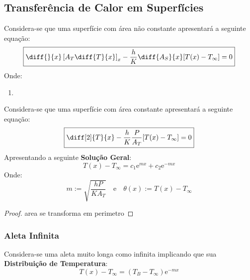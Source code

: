 \documentclass{article}
\begin{document}
        \subsection{Transferência de Calor em Superfícies}
            \begin{definition}
                Considera-se que uma superfície com área não constante apresentará a seguinte equação:
                    \begin{equation}
                        \boxed{
                            \diff{}{x} \left[A_{T}\diff{T}{x}\right]_{\substack{x}} -
                            \frac{h}{K}\diff{A_{S}}{x}[T(x) - T_{\infty}] = 0
                        }
                    \end{equation}
                Onde:
                    \begin{enumerate}
                        \item 
                    \end{enumerate}
            \end{definition}
            \begin{definition}
                Considera-se que uma superfície com área constante apresentará a seguinte equação:
                    \begin{equation}
                        \boxed{
                            \diff[2]{T}{x} -
                            \frac{h}{K}\frac{P}{A_{T}}[T(x) - T_{\infty}] = 0
                        }
                    \end{equation}
                Apresentando a seguinte \textbf{Solução Geral}:
                    \begin{equation}
                        \boxed{
                            T(x) - T_{\infty} = 
                            c_{1}\text{e}^{mx} + c_{2}\text{e}^{-mx}
                        }
                    \end{equation}
                Onde:
                    \begin{equation*}
                        \boxed{m := \sqrt{\frac{h P}{K A_{T}}}}
                        \quad
                        \text{e}
                        \quad
                        \boxed{\theta(x) := T(x) - T_{\infty}}
                    \end{equation*}
            \end{definition}
            \begin{proof}
            area se transforma em perimetro
            \end{proof}

        \subsubsection{Aleta Infinita}
            \begin{definition}
                Considera-se uma aleta muito longa como infinita implicando que sua \textbf{Distribuição de Temperatura}:
                    \begin{equation}
                        T(x) - T_{\infty} = 
                        (T_{B} - T_{\infty})\text{e}^{-mx}
                    \end{equation}
            \end{definition}
\end{document}
